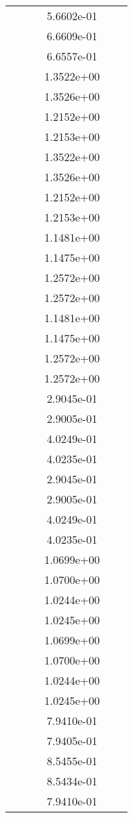\begin{xltabular}{\textwidth}{r|rS[table-format=1.3e+2]S[table-format=1.4e+2]S[table-format=1.4e+2]S[table-format=-1.5]}
&  &  & 5.6602e-01 & & \\
&  &  & 6.6609e-01 & & \\
&  &  & 6.6557e-01 & & \\
&  &  & 1.3522e+00 & & \\
&  &  & 1.3526e+00 & & \\
&  &  & 1.2152e+00 & & \\
&  &  & 1.2153e+00 & & \\
&  &  & 1.3522e+00 & & \\
&  &  & 1.3526e+00 & & \\
&  &  & 1.2152e+00 & & \\
&  &  & 1.2153e+00 & & \\
&  &  & 1.1481e+00 & & \\
&  &  & 1.1475e+00 & & \\
&  &  & 1.2572e+00 & & \\
&  &  & 1.2572e+00 & & \\
&  &  & 1.1481e+00 & & \\
&  &  & 1.1475e+00 & & \\
&  &  & 1.2572e+00 & & \\
&  &  & 1.2572e+00 & & \\
&  &  & 2.9045e-01 & & \\
&  &  & 2.9005e-01 & & \\
&  &  & 4.0249e-01 & & \\
&  &  & 4.0235e-01 & & \\
&  &  & 2.9045e-01 & & \\
&  &  & 2.9005e-01 & & \\
&  &  & 4.0249e-01 & & \\
&  &  & 4.0235e-01 & & \\
&  &  & 1.0699e+00 & & \\
&  &  & 1.0700e+00 & & \\
&  &  & 1.0244e+00 & & \\
&  &  & 1.0245e+00 & & \\
&  &  & 1.0699e+00 & & \\
&  &  & 1.0700e+00 & & \\
&  &  & 1.0244e+00 & & \\
&  &  & 1.0245e+00 & & \\
&  &  & 7.9410e-01 & & \\
&  &  & 7.9405e-01 & & \\
&  &  & 8.5455e-01 & & \\
&  &  & 8.5434e-01 & & \\
&  &  & 7.9410e-01 & & \\

\end{xltabular}
